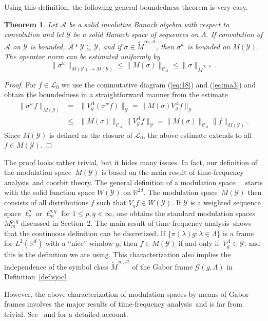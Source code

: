 \documentclass[12pt]{amsart}
\newtheorem{theorem}{Theorem}[section]
\theoremstyle{definition}
\theoremstyle{remark}
\numberwithin{equation}{section}
\newcommand{\tfa}{time-frequency analysis}
\newcommand{\modsp}{modulation space}
\newcommand{\symbo}{\widetilde M^{\infty, \cA}}
\def\cG{\mathcal{G}}
\def\cA{\mathcal{A}}
\def\cL{\mathcal{L}}
\def\cY{\mathcal{Y}}
\def\bR{{\mathbb{R}}}
\def\cca{\Cal C_\ac}
\def\rd{\bR^d}
\def\rdd{{\bR^{2d}}}
\def\lrd{L^2(\rd)}
\def\lpm{\ell ^p_v}
\def\Mmpq{M_m^{p,q}}
\def\cG{\mathcal{G}}
\def\cA{\mathcal{A}}
\newcommand{\fif}{if and only if}
\newcommand{\Cal}{\mathcal}
\newcommand{\La}{\Lambda}
\newcommand{\ac}{\Cal A}
\newcommand{\moda}{\widetilde M^{\infty,\ac}}
\begin{document}
Using this definition, the following general boundedness theorem
is very easy. 


\begin{theorem}\label{bound}
Let $\cA $ be a solid involutive Banach algebra with respect to
convolution and let $\cY$ be a  solid  Banach space of sequences
on
$\Lambda $.   If  convolution of $\cA $  on $\cY$ is bounded, $\cA
\ast
\cY\subseteq \cY$,  and if  $\sigma \in
\moda$, then $\sigma ^w $ is bounded on $M(\cY)$. The operator
norm
can be estimated uniformly by $$ \|\sigma^w \|_{M(\cY) \to M(\cY)}
\leq
\|M(\sigma )\|_{\cca} \le \|\sigma \|_{\moda} \, .$$
\end{theorem}
\begin{proof} For $f\in\cL _0$ we use the commutative diagram  (\ref{eq:18}) and
(\ref{eq:ma3}) and obtain the boundedness in a straightforward
manner
from the estimate
\begin{eqnarray*}
\|\sigma^wf\|_{M(\cY)}&=&\|V_g^\La(\sigma^wf)\|_\cY=\|M(\sigma)V_g^\La
f\|_\cY\\
&\le & \|M(\sigma)\|_{\cca}\|V_g^\La f\|_\cY=
\|M(\sigma)\|_{\cca}\|f\|_{M(\cY)}.
\end{eqnarray*}
Since $M(\cY)$ is defined as the  closure of $\cL _0$, the above
estimate extends to
all $f\in M(\cY)$.
\end{proof}


 The proof looks rather trivial, but it hides many issues. In fact,
 our definition of the \modsp\ $M(\cY)$ is based on the main result
 of \tfa\  and coorbit theory. The general definition of a \modsp\
 ~\cite[Ch.~11.4]{book} starts with the solid function space $W(\cY )$
 on $\rdd $. The \modsp\ $M(\cY )$ then consists of all distributions
 $f$ such that $V_gf\in W(\cY )$. If $\cY$ is a weighted sequence
 space $\lpm $ or $\ell ^{p,q}_m $ for $1\leq p,q < \infty $, one
 obtains the standard \modsp s $\Mmpq $ discussed in Section~2. The main result of \tfa\ shows that the continuous definition can
 be discretized. If $\{ \pi (\lambda ) g: \lambda \in \Lambda \}$ is a
 frame for $\lrd $ with a ``nice'' window $g$, then $f\in M(\cY )$
 \fif\ $V_g^\Lambda \in \cY $; and this is the definition we are
 using. This characterization also implies the independence of the
 symbol class $\symbo$ of the Gabor frame $\cG (g, \Lambda )$ in 
Definition~\ref{def:sjocl}. 

However, the above  characterization of \modsp s by means of Gabor
 frames involves the major results of \tfa\ and is far from trivial. See~\cite{fg89jfa,fg92chui}
 and \cite[Chs.~11-13]{book} for a detailed account. 
\end{document}
